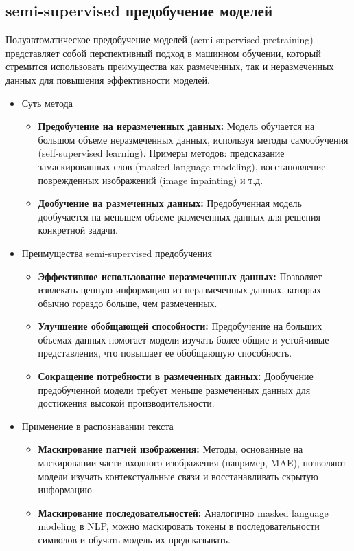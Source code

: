 \subsection{semi-supervised предобучение моделей}
Полуавтоматическое предобучение моделей (semi-supervised pretraining) представляет собой перспективный подход в машинном обучении, который стремится использовать преимущества как размеченных, так и неразмеченных данных для повышения эффективности моделей. 
\begin{itemize}
    \item Суть метода
    \begin{itemize}
        \item \textbf{Предобучение на неразмеченных данных:} Модель обучается на большом объеме неразмеченных данных, используя методы самообучения (self-supervised learning). 
        Примеры методов:  предсказание замаскированных слов (masked language modeling), восстановление поврежденных изображений (image inpainting) и т.д.
        \item \textbf{Дообучение на размеченных данных:} Предобученная модель дообучается на меньшем объеме размеченных данных для решения конкретной задачи.
    \end{itemize}

    \item{Преимущества semi-supervised предобучения}

    \begin{itemize}
        \item \textbf{Эффективное использование неразмеченных данных:} Позволяет извлекать ценную информацию из неразмеченных данных, которых обычно гораздо больше, чем размеченных.
        \item \textbf{Улучшение обобщающей способности:} Предобучение на больших объемах данных помогает модели изучать более общие и устойчивые представления, что повышает ее обобщающую способность.
        \item \textbf{Сокращение потребности в размеченных данных:} Дообучение предобученной модели требует меньше размеченных данных для достижения высокой производительности.
    \end{itemize}

    \item{Применение в распознавании текста}

    \begin{itemize}
        \item \textbf{Маскирование патчей изображения:} Методы, основанные на маскировании части входного изображения (например, MAE\cite{he2021masked}), позволяют модели изучать контекстуальные связи и восстанавливать скрытую информацию.
        \item \textbf{Маскирование последовательностей:} Аналогично masked language modeling в NLP, можно маскировать токены в последовательности символов и обучать модель их предсказывать.
    \end{itemize}
\end{itemize}
